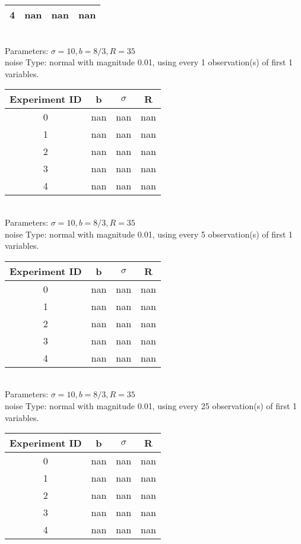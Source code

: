 \begin{multicols}{3}
\begin{tabular}{cccc}
 4 & nan & nan & nan\\ \hline 
 \end{tabular}\\
Parameters: $\sigma=10, b=8/3, R=35$\\
noise Type: normal with magnitude 0.01, using every 1 observation(s) of first 1 variables.\\
\begin{tabular}{cccc}
\hline Experiment ID & b & $\sigma$ & R \\ \hline 
0 & nan & nan & nan\\ \hline 
 1 & nan & nan & nan\\ \hline 
 2 & nan & nan & nan\\ \hline 
 3 & nan & nan & nan\\ \hline 
 4 & nan & nan & nan\\ \hline 
 \end{tabular}\\
Parameters: $\sigma=10, b=8/3, R=35$\\
noise Type: normal with magnitude 0.01, using every 5 observation(s) of first 1 variables.\\
\begin{tabular}{cccc}
\hline Experiment ID & b & $\sigma$ & R \\ \hline 
0 & nan & nan & nan\\ \hline 
 1 & nan & nan & nan\\ \hline 
 2 & nan & nan & nan\\ \hline 
 3 & nan & nan & nan\\ \hline 
 4 & nan & nan & nan\\ \hline 
 \end{tabular}\\
Parameters: $\sigma=10, b=8/3, R=35$\\
noise Type: normal with magnitude 0.01, using every 25 observation(s) of first 1 variables.\\
\begin{tabular}{cccc}
\hline Experiment ID & b & $\sigma$ & R \\ \hline 
0 & nan & nan & nan\\ \hline 
 1 & nan & nan & nan\\ \hline 
 2 & nan & nan & nan\\ \hline 
 3 & nan & nan & nan\\ \hline 
 4 & nan & nan & nan\\ \hline 
 \end{tabular}\\

\end{multicols}
